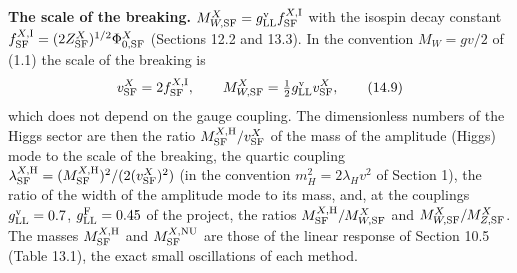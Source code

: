 \documentclass[
  10pt,
]{article}
\begin{document}
\textbf{The scale of the breaking.}
\(M^X_{W,{\rm SF}}=g^{\rm v}_{\rm LL}f^{X,{\rm I}}_{\rm SF}\) with the
isospin decay constant
\(f^{X,{\rm I}}_{\rm SF}=(2Z^X_{\rm SF})^{1/2}\Phi^X_{0,{\rm SF}}\)
(Sections 12.2 and 13.3). In the convention \(M_W=gv/2\) of (1.1) the
scale of the breaking is
\[v^X_{\rm SF}=2f^{X,{\rm I}}_{\rm SF},\qquad M^X_{W,{\rm SF}}=\tfrac12g^{\rm v}_{\rm LL}v^X_{\rm SF},\tag{14.9}\]
which does not depend on the gauge coupling. The dimensionless numbers
of the Higgs sector are then the ratio
\(M^{X,{\rm H}}_{\rm SF}/v^X_{\rm SF}\) of the mass of the amplitude
(Higgs) mode to the scale of the breaking, the quartic coupling
\(\lambda^{X,{\rm H}}_{\rm SF}=(M^{X,{\rm H}}_{\rm SF})^2/(2(v^X_{\rm SF})^2)\)
(in the convention \(m_H^2=2\lambda_Hv^2\) of Section 1), the ratio of
the width of the amplitude mode to its mass, and, at the couplings
\(g^{\rm v}_{\rm LL}=0.7\), \(g^{\rm F}_{\rm LL}=0.45\) of the project,
the ratios \(M^{X,{\rm H}}_{\rm SF}/M^X_{W,{\rm SF}}\) and
\(M^X_{W,{\rm SF}}/M^X_{Z,{\rm SF}}\). The masses
\(M^{X,{\rm H}}_{\rm SF}\) and \(M^{X,{\rm NU}}_{\rm SF}\) are those of
the linear response of Section 10.5 (Table 13.1), the exact small
oscillations of each method.
\end{document}
